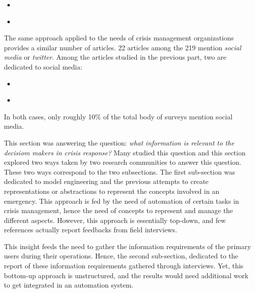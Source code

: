\begin{itemize}
    \item \textcite{purohitIdentifyingSeekersSuppliers2014a}
    \item \textcite{ghahremanlouGeotaggingTwitterMessages2014a}
\end{itemize}

The same approach applied to the needs of crisis management organizations provides a similar number of articles.
22 articles among the 219 mention \emph{social media} or \emph{twitter}.
Among the articles studied in the previous part, two are dedicated to social media:

\begin{itemize}
    \item \textcite{cobbDesigningDelugeUnderstanding2014a}
    \item \textcite{tapiaTrustworthyTweetDeeper2013a}
\end{itemize}

In both cases, only roughly 10\% of the total body of surveys mention social media.

This section was answering the question: \emph{what information is relevant to the decisiom makers in crisis response?}
Many studied this question and this section explored two ways taken by two research communities to answer this question.
These two ways correspond to the two subsections.
The first sub-section was dedicated to model engineering and the previous attempts to create representations or abstractions to represent the concepts involved in an emergency.
This approach is fed by the need of automation of certain tasks in crisis management, hence the need of concepts to represent and manage the different aspects.
However, this approach is essentially top-down, and few references actually report feedbacks from field interviews.

This insight feeds the need to gather the information requirements of the primary users during their operations.
Hence, the second sub-section, dedicated to the report of these information requirements gathered through interviews.
Yet, this bottom-up approach is unstructured, and the results would need additional work to get integrated in an automation system.

